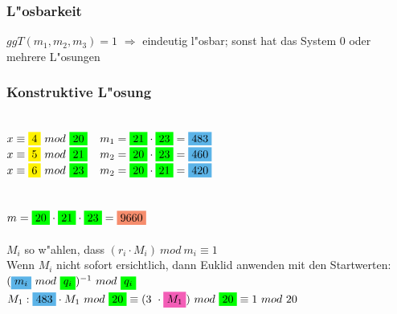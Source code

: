 \documentclass[10pt,a4paper,landscape]{article}
\begin{document}
\begin{multicols*}{3}
		\subsubsection{L"osbarkeit}
		$ggT(m_1, m_2, m_3) = 1$ $\Rightarrow$ eindeutig l"osbar;
		sonst hat das System 0 oder mehrere L"osungen
		\begin{minipage}{\linewidth}
			\subsubsection{Konstruktive L"osung}
			
			\begin{onehalfspacing}
				\\
				$x \equiv \colorbox{yellow}{4}~mod~\colorbox{green}{20}$~~$m_1 = \colorbox{green}{21}      \cdot \colorbox{green}{23} = \colorbox{CornflowerBlue}{483}$\\
				$x \equiv \colorbox{yellow}{5}~mod~\colorbox{green}{21}$~~$m_2 = \colorbox{green}{20} \cdot \colorbox{green}{23} = \colorbox{CornflowerBlue}{460}$  \\
				$x \equiv \colorbox{yellow}{6}~mod~\colorbox{green}{23}$~~$m_2 = \colorbox{green}{20} \cdot \colorbox{green}{21} = \colorbox{CornflowerBlue}{420}$  \\
				\\
				\\
				$m = \colorbox{green}{20} \cdot \colorbox{green}{21} \cdot \colorbox{green}{23} = \colorbox{Melon}{9660}$\\
				\\
				$M_i$ so w"ahlen, dass $(r_i \cdot M_i)~mod~m_i \equiv 1$\\
				Wenn $M_i$ nicht sofort ersichtlich, dann Euklid anwenden mit den Startwerten: $(\colorbox{CornflowerBlue}{$m_i$}~mod~\colorbox{green}{$q_i$})^{-1}~mod~\colorbox{green}{$q_i$}$
				\\
				$M_1: \colorbox{CornflowerBlue}{483} \cdot M_1~mod~\colorbox{green}{20} \equiv (3~\cdot \colorbox{CarnationPink}{$M_1$})~mod~\colorbox{green}{20} \equiv 1~mod~20$\\

\end{onehalfspacing}
\end{minipage}
\end{multicols*}
\end{document}
